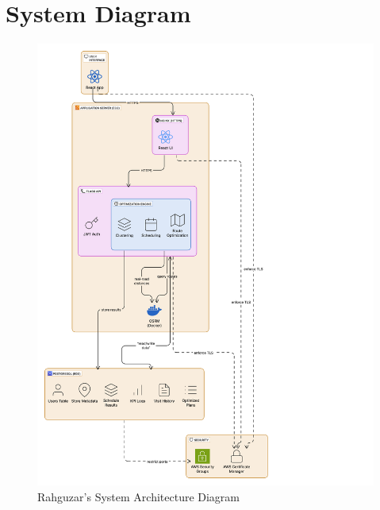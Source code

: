 \section{System Diagram}
\begin{center}
        \begin{figure}[H]
        \centering
        \includegraphics[width=\textwidth, height=0.75\textheight]{images/diagram.png} 
        \caption{Rahguzar's System Architecture Diagram}
    \end{figure}
\end{center}